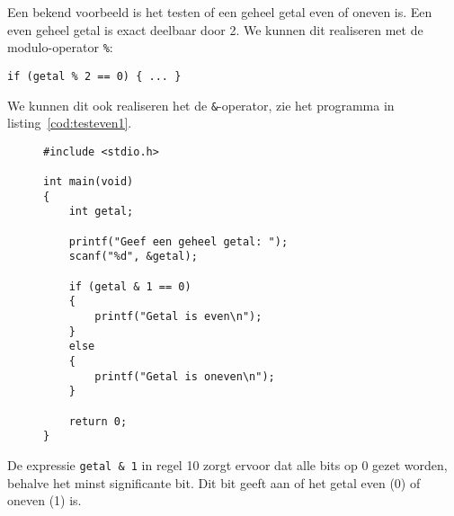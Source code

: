 Een bekend voorbeeld is het testen of een geheel getal even of oneven is. Een even geheel getal is exact deelbaar door 2. We kunnen dit realiseren met de modulo-operator \texttt{\%}:

\hspace*{1em}\texttt{if (getal \% 2 == 0) \{ ... \}}

We kunnen dit ook realiseren het de \texttt{\&}-operator, zie het programma in listing~\ref{cod:testeven1}.
%
\begin{figure}[!ht]
\begin{lstlisting}[caption=Testen of een geheel getal even is.,label=cod:testeven1]
#include <stdio.h>

int main(void)
{
    int getal;
    
    printf("Geef een geheel getal: ");
    scanf("%d", &getal);
    
    if (getal & 1 == 0)
    {
        printf("Getal is even\n");
    } 
    else
    {
        printf("Getal is oneven\n");
    }
    
    return 0;
}
\end{lstlisting}
\end{figure}
%
De expressie \texttt{getal \& 1} in regel 10 zorgt ervoor dat alle bits op 0 gezet worden, behalve het minst significante bit. Dit bit geeft aan of het getal even (0) of oneven (1) is.



